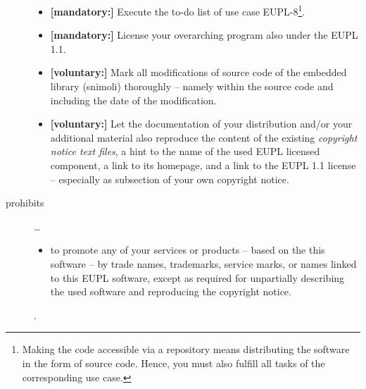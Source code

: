 \begin{description}
\begin{itemize}
  \item \textbf{[mandatory:]} Execute the to-do list of use case EUPL-8\footnote{
  Making the code accessible via a repository means distributing the software in
  the form of source code. Hence, you must also fulfill all tasks of the
  corresponding use case.}.
  
  \item \textbf{[mandatory:]} License your overarching program also under the
  EUPL 1.1.
  
  \item \textbf{[voluntary:]} Mark all modifications of source code of the
  embedded library (snimoli) thoroughly -- namely within the source code and
  including the date of the modification.

  \item \textbf{[voluntary:]} Let the documentation of your distribution and/or
  your additional material  also reproduce the content of the existing
  \emph{copyright notice text files}, a hint to the name of the used EUPL
  licensed component, a link to its homepage, and a link to the EUPL 1.1 license
  -- especially as subsection of your own copyright notice.
  
\end{itemize}

\item[prohibits] \ldots
\begin{itemize}
  \item to promote any of your services or products – based on the this software
  – by trade names, trademarks, service marks, or names linked to this EUPL
  software, except as required for unpartially describing the used software and
  reproducing the copyright notice.
\end{itemize}.

\end{description}

